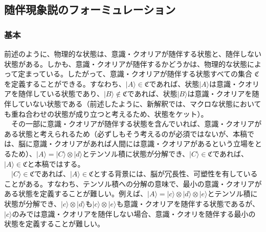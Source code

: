 \subsection{随伴現象説のフォーミュレーション}
\subsubsection{基本}
前述のように、物理的な状態は、意識・クオリアが随伴する状態と、随伴しない状態がある。しかも、意識・クオリアが随伴するかどうかは、物理的な状態によって定まっている。したがって、意識・クオリアが随伴する状態すべての集合 $\mathfrak{C}$ を定義することができる。すなわち、$|A\rangle \in \mathfrak{C}$であれば、状態$|A\rangle$は意識・クオリアを随伴している状態であり、$|B\rangle \notin \mathfrak{C}$であれば、状態$|B\rangle$は意識・クオリアを随伴していない状態である（前述したように、新解釈では、マクロな状態においても重ね合わせの状態が成り立つと考えるため、状態をケット）。\\
　その一部に意識・クオリアが随伴する状態を含んでいれば、意識・クオリアがある状態と考えられるため（必ずしもそう考えるのが必須ではないが、本稿では、脳に意識・クオリアがあれば人間には意識・クオリアがあるという立場をとるため）、$|A\rangle = |C\rangle \otimes |d\rangle$とテンソル積に状態が分解でき、$|C\rangle\in\mathfrak{C}$であれば、$|A\rangle\in\mathfrak{C}$と本稿ではする。\\
　$|C\rangle\in\mathfrak{C}$であれば、$|A\rangle\in\mathfrak{C}$とする背景には、脳が冗長性、可塑性を有していることがある。すなわち、テンソル積への分解の意味で、最小の意識・クオリアがある状態を定義することが難しい。例えば、$|A\rangle = |c\rangle \otimes |d\rangle \otimes |e\rangle$とテンソル積に状態が分解でき、$|c\rangle \otimes |d\rangle$も$|c\rangle \otimes |e\rangle$も意識・クオリアを随伴する状態であるが、$|c\rangle$のみでは意識・クオリアを随伴しない場合、意識・クオリを随伴する最小の状態を定義することが難しい。